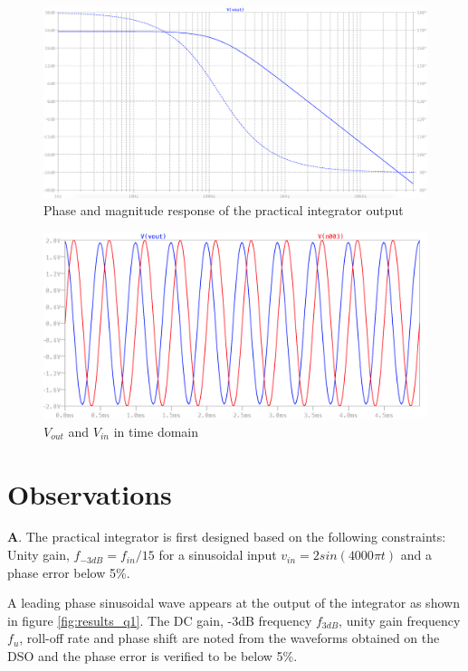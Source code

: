 \documentclass[12pt, titlepage]{article}
\theoremstyle{definition}
\begin{document}
    \begin{figure}[h]
      \centering
      \includegraphics[scale=0.3]{sim_plot_fd}
      \caption{Phase and magnitude response of the practical integrator output}
    \end{figure}
    \begin{figure}[h]
      \centering
      \includegraphics[scale=0.5]{sim_plot_td}
      \caption{\color{blue}$V_{out}$ \color{black}and \color{red}$V_{in}$ \color{black}in time domain}
    \end{figure}


  \newpage
  \section{Observations}
    \textbf{A}. The practical integrator is first designed based on the following constraints:
    Unity gain, $f_{-3dB} = f_{in}/15$ for a sinusoidal input
    $v_{in} = 2 sin(4000\pi t)$ and a phase error below 5\%.

    A leading phase sinusoidal wave appears at the output of the integrator as shown in figure \ref{fig:results_q1}.
    The DC gain, -3dB frequency $f_{3dB}$, unity gain frequency $f_u$, roll-off rate and phase shift are noted from the waveforms obtained on the DSO and the phase error is verified to be below 5\%.
\end{document}
